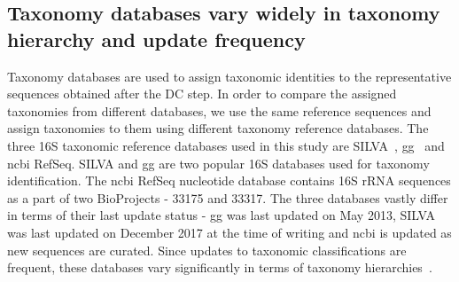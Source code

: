   \FloatBarrier

  \subsection*{Taxonomy databases vary widely in taxonomy hierarchy and update frequency}

  Taxonomy databases are used to assign taxonomic identities to the representative sequences obtained after the DC step.
  In order to compare the assigned taxonomies from different databases, we use the same reference sequences and assign taxonomies to them using different taxonomy reference databases.
  The three 16S taxonomic reference databases used in this study are SILVA~\cite{Quast2012}, \ac{gg}~\cite{DeSantis2006} and \ac{ncbi} RefSeq.
  SILVA and \ac{gg} are two popular 16S databases used for taxonomy identification.
  The \ac{ncbi} RefSeq nucleotide database contains 16S rRNA sequences as a part of two BioProjects - 33175 and 33317.
  The three databases vastly differ in terms of their last update status - \ac{gg} was last updated on May 2013, SILVA was last updated on December 2017 at the time of writing and \ac{ncbi} is updated as new sequences are curated.
  Since updates to taxonomic classifications are frequent, these databases vary significantly in terms of taxonomy hierarchies~\cite{Balvociute2017}.

